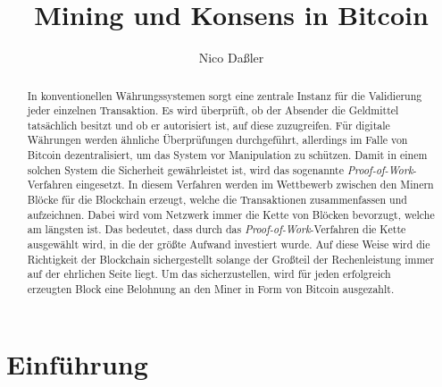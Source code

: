 \documentclass[ngerman,runningheads,a4paper]{llncs}[2018/03/10]
\begin{document}
\title{Mining und Konsens in Bitcoin}

\author{Nico Daßler}

%
%

\maketitle

\begin{abstract}
In konventionellen Währungssystemen sorgt eine zentrale Instanz für die Validierung jeder einzelnen Transaktion. Es wird überprüft, ob der Absender die Geldmittel tatsächlich besitzt und ob er autorisiert ist, auf diese zuzugreifen. Für digitale Währungen werden ähnliche Überprüfungen durchgeführt, allerdings im Falle von Bitcoin dezentralisiert, um das System vor Manipulation zu schützen. Damit in einem solchen System die Sicherheit gewährleistet ist, wird das sogenannte \textit{Proof-of-Work}-Verfahren eingesetzt. In diesem Verfahren werden im Wettbewerb zwischen den Minern Blöcke für die Blockchain erzeugt, welche die Transaktionen zusammenfassen und aufzeichnen. Dabei wird vom Netzwerk immer die Kette von Blöcken bevorzugt, welche am längsten ist. Das bedeutet, dass durch das \textit{Proof-of-Work}-Verfahren die Kette ausgewählt wird, in die der größte Aufwand investiert wurde. Auf diese Weise wird die Richtigkeit der Blockchain sichergestellt solange der Großteil der Rechenleistung immer auf der ehrlichen Seite liegt. Um das sicherzustellen, wird für jeden erfolgreich erzeugten Block eine Belohnung an den Miner in Form von Bitcoin ausgezahlt.
\end{abstract}



\section{Einführung}\label{sec:einführung}
\end{document}
